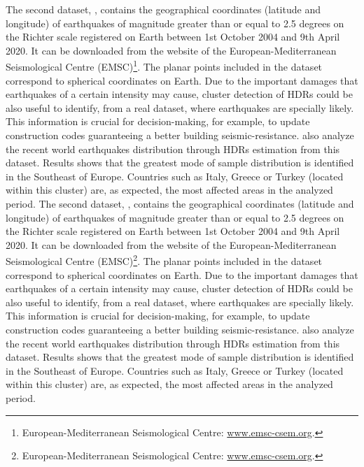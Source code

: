 The second dataset, , contains the geographical coordinates (latitude and longitude) of earthquakes of magnitude greater than or equal to 2.5 degrees on the Richter scale registered on Earth between 1st October 2004 and 9th April 2020. It can be downloaded from the website of the European-Mediterranean Seismological Centre (EMSC)\footnote{European-Mediterranean Seismological Centre: \url{www.emsc-csem.org}.}. The planar points included in the dataset correspond to spherical coordinates on Earth. Due to the important damages that earthquakes of a certain intensity may cause, cluster detection of HDRs could be also useful to identify, from a real dataset, where earthquakes are specially likely. This information is crucial for decision-making, for example, to update construction codes guaranteeing a better building seismic-resistance. \cite{saavedra2020nonparametric} also analyze the recent world earthquakes distribution through HDRs estimation from this dataset. Results shows that the greatest mode of sample distribution is identified in the Southeast of Europe. Countries such as Italy, Greece or Turkey (located within this cluster) are, as expected, the most affected areas in the analyzed period. 
The second dataset, , contains the geographical coordinates (latitude and longitude) of earthquakes of magnitude greater than or equal to 2.5 degrees on the Richter scale registered on Earth between 1st October 2004 and 9th April 2020. It can be downloaded from the website of the European-Mediterranean Seismological Centre (EMSC)\footnote{European-Mediterranean Seismological Centre: \url{www.emsc-csem.org}.}. The planar points included in the dataset correspond to spherical coordinates on Earth. Due to the important damages that earthquakes of a certain intensity may cause, cluster detection of HDRs could be also useful to identify, from a real dataset, where earthquakes are specially likely. This information is crucial for decision-making, for example, to update construction codes guaranteeing a better building seismic-resistance. \cite{saavedra2020nonparametric} also analyze the recent world earthquakes distribution through HDRs estimation from this dataset. Results shows that the greatest mode of sample distribution is identified in the Southeast of Europe. Countries such as Italy, Greece or Turkey (located within this cluster) are, as expected, the most affected areas in the analyzed period. 




